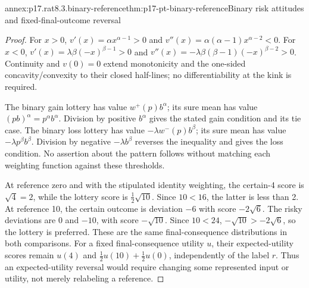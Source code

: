 \begin{annexitem}{annex:p17.rat8.3.binary-reference}{thm:p17-pt-binary-reference}{Binary risk attitudes and fixed-final-outcome reversal}
\begin{proof}
For \(x>0\), \(v'(x)=\alpha x^{\alpha-1}>0\) and
\(v''(x)=\alpha(\alpha-1)x^{\alpha-2}<0\). For \(x<0\),
\(v'(x)=\lambda\beta(-x)^{\beta-1}>0\) and
\(v''(x)=-\lambda\beta(\beta-1)(-x)^{\beta-2}>0\).
Continuity and \(v(0)=0\) extend monotonicity and the one-sided
concavity/convexity to their closed half-lines; no differentiability
at the kink is required.

The binary gain lottery has value \(w^+(p)b^\alpha\); its sure
mean has value \((pb)^\alpha=p^\alpha b^\alpha\). Division by
positive \(b^\alpha\) gives the stated gain condition and its tie
case. The binary loss lottery has value
\(-\lambda w^-(p)b^\beta\); its sure mean has value
\(-\lambda p^\beta b^\beta\). Division by negative
\(-\lambda b^\beta\) reverses the inequality and gives the
loss condition. No assertion about the pattern follows without
matching each weighting function against these thresholds.

At reference zero and with the stipulated identity weighting,
the certain-4 score is \(\sqrt4=2\), while the lottery score is
\(\tfrac12\sqrt{10}\). Since \(10<16\), the latter is less
than 2. At reference 10, the certain outcome is deviation \(-6\)
with score \(-2\sqrt6\). The risky deviations are 0 and \(-10\),
with score \(-\sqrt{10}\). Since \(10<24\),
\(-\sqrt{10}>-2\sqrt6\), so the lottery is preferred.
These are the same final-consequence distributions in both
comparisons. For a fixed final-consequence utility \(u\), their
expected-utility scores remain \(u(4)\) and
\(\tfrac12u(10)+\tfrac12u(0)\), independently of the label
\(r\). Thus an expected-utility reversal would require changing
some represented input or utility, not merely relabeling a reference.
\end{proof}
\end{annexitem}

